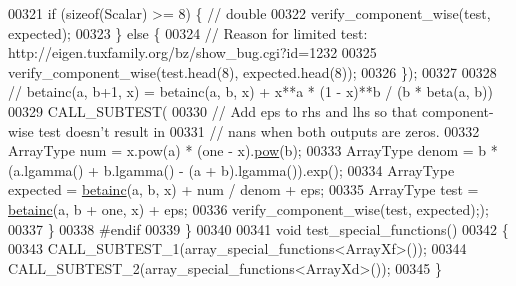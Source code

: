 \begin{DoxyCode}
00321         \textcolor{keywordflow}{if} (\textcolor{keyword}{sizeof}(Scalar) >= 8) \{ \textcolor{comment}{// double}
00322           verify\_component\_wise(test, expected);
00323         \} \textcolor{keywordflow}{else} \{
00324           \textcolor{comment}{// Reason for limited test: http://eigen.tuxfamily.org/bz/show\_bug.cgi?id=1232}
00325           verify\_component\_wise(test.head(8), expected.head(8));
00326         \});
00327 
00328     \textcolor{comment}{// betainc(a, b+1, x) = betainc(a, b, x) + x**a * (1 - x)**b / (b * beta(a, b))}
00329     CALL\_SUBTEST(
00330         \textcolor{comment}{// Add eps to rhs and lhs so that component-wise test doesn't result in}
00331         \textcolor{comment}{// nans when both outputs are zeros.}
00332         ArrayType num = x.pow(a) * (one - x).\hyperlink{group___core___module_ab6dc101d82e8228a19a8840e3a29c1c9}{pow}(b);
00333         ArrayType denom = b * (a.lgamma() + b.lgamma() - (a + b).lgamma()).exp();
00334         ArrayType expected = \hyperlink{namespace_eigen_a726eae91d4e91d8e25cbe55fffa6a92f}{betainc}(a, b, x) + num / denom + eps;
00335         ArrayType test = \hyperlink{namespace_eigen_a726eae91d4e91d8e25cbe55fffa6a92f}{betainc}(a, b + one, x) + eps;
00336         verify\_component\_wise(test, expected););
00337   \}
00338 \textcolor{preprocessor}{#endif}
00339 \}
00340 
00341 \textcolor{keywordtype}{void} test\_special\_functions()
00342 \{
00343   CALL\_SUBTEST\_1(array\_special\_functions<ArrayXf>());
00344   CALL\_SUBTEST\_2(array\_special\_functions<ArrayXd>());
00345 \}
\end{DoxyCode}

